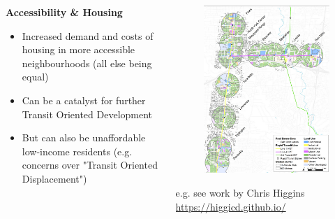 \documentclass[aspectratio=169]{beamer}
\begin{document}
\begin{frame}
	
	

	\begin{columns}
		\begin{column}{0.5\textwidth}
			
			\textbf{Accessibility \& Housing}
			
			\small
			
			\begin{itemize}
				\item Increased demand and costs of housing in more accessible neighbourhoods (all else being equal)
				\item Can be a catalyst for further Transit Oriented Development
				\item But can also be unaffordable low-income residents (e.g. concerns over "Transit Oriented Displacement")
			\end{itemize}
			
		\end{column}
		
		\begin{column}{0.5\textwidth}
			
			\begin{figure}
				\centering
				\includegraphics[width=0.8\linewidth]{images/access_values.png}
			\end{figure}
		
		\tiny e.g. see work by Chris Higgins \url{https://higgicd.github.io/}
			
		\end{column}
		
	\end{columns}
	
\end{frame}
\end{document}
